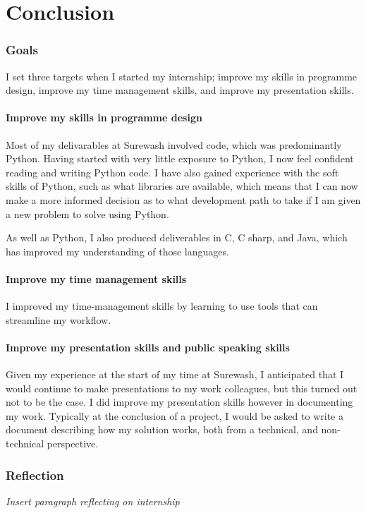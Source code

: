 \part{Conclusion}
\section{Goals}
I set three targets when I started my internship; improve my skills in programme design, improve my time management skills, and improve my presentation skills.
    \subsection{Improve my skills in programme design} Most of my delivarables at Surewash involved code, which was predominantly Python. Having started with very little exposure to Python, I now feel confident reading and writing Python code. I have also gained experience with the soft skills of Python, such as what libraries are available, which means that I can now make a more informed decision as to what development path to take if I am given a new problem to solve using Python.

    As well as Python, I also produced deliverables in C, C sharp, and Java, which has improved my understanding of those languages.

    \subsection{Improve my time management skills} I improved my time-management skills by learning to use tools that can streamline my workflow.

    \subsection{Improve my presentation skills and public speaking skills} Given my experience at the start of my time at Surewash, I anticipated that I would continue to make presentations to my work colleagues, but this turned out not to be the case. I did improve my presentation skills however in documenting my work. Typically at the conclusion of a project, I would be asked to write a document describing how my solution works, both from a technical, and non-technical perspective.

\section{Reflection}
{\itshape Insert paragraph reflecting on internship}